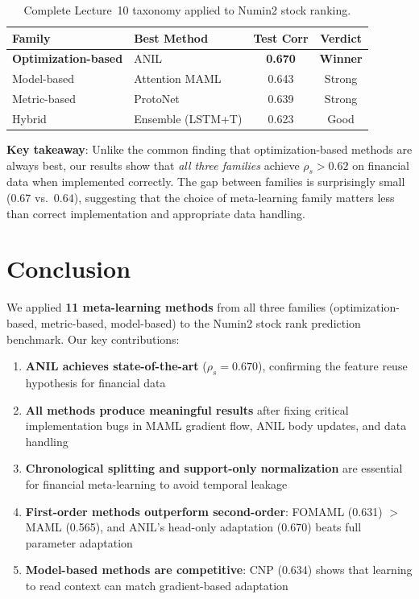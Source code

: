 \documentclass[11pt,a4paper]{article}
\begin{document}
\begin{table}[H]\centering
\caption{Complete Lecture~10 taxonomy applied to Numin2 stock ranking.}
\vspace{4pt}
\begin{tabular}{llcc}\toprule
\textbf{Family} & \textbf{Best Method} & \textbf{Test Corr} & \textbf{Verdict} \\\midrule
\rowcolor{green!8} \textbf{Optimization-based} & ANIL~\cite{raghu2020} & \textcolor{bestgreen}{\textbf{0.670}} & \textbf{Winner} \\
Model-based & Attention MAML & 0.643 & Strong \\
Metric-based & ProtoNet~\cite{snell2017} & 0.639 & Strong \\
Hybrid & Ensemble (LSTM+T) & 0.623 & Good \\
\bottomrule\end{tabular}
\end{table}

\textbf{Key takeaway}: Unlike the common finding that optimization-based methods are always best, our results show that \emph{all three families} achieve $\rho_s > 0.62$ on financial data when implemented correctly. The gap between families is surprisingly small ($0.67$ vs.\ $0.64$), suggesting that the choice of meta-learning family matters less than correct implementation and appropriate data handling.

\section{Conclusion}

We applied \textbf{11 meta-learning methods} from all three families (optimization-based, metric-based, model-based) to the Numin2 stock rank prediction benchmark. Our key contributions:

\begin{enumerate}[nosep]
  \item \textbf{ANIL achieves state-of-the-art} ($\rho_s = 0.670$), confirming the feature reuse hypothesis for financial data
  \item \textbf{All methods produce meaningful results} after fixing critical implementation bugs in MAML gradient flow, ANIL body updates, and data handling
  \item \textbf{Chronological splitting and support-only normalization} are essential for financial meta-learning to avoid temporal leakage
  \item \textbf{First-order methods outperform second-order}: FOMAML (0.631) $>$ MAML (0.565), and ANIL's head-only adaptation (0.670) beats full parameter adaptation
  \item \textbf{Model-based methods are competitive}: CNP (0.634) shows that learning to read context can match gradient-based adaptation
\end{enumerate}
\end{document}

